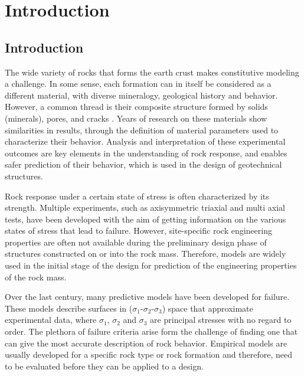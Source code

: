 \chapter{Introduction}
\section{Introduction}

The wide variety of rocks that forms the earth crust makes constitutive modeling a challenge. In some sense, each formation can in itself be considered as a different material, with diverse mineralogy, geological history and behavior. However, a common thread is their composite structure formed by solids (minerals), pores, and cracks \cite{Labuz2018}. Years of research on these materials show similarities in results, through the definition of material parameters used to characterize their behavior. Analysis and interpretation of these experimental outcomes are key elements in the understanding of rock response, and enables safer prediction of their behavior, which is used in the design of geotechnical structures. 

Rock response under a certain state of stress is often characterized by its strength. Multiple experiments, such as axisymmetric triaxial and multi axial tests, have been developed with the aim of getting information on the various states of stress that lead to failure. However, site-specific rock engineering properties are often not available during the preliminary design phase of structures constructed on or into the rock mass. Therefore, models are widely used in the initial stage of the design for prediction of the engineering properties of the rock mass. 

Over the last century, many predictive models have been developed for failure. These models describe surfaces in ($\sigma_1$-$\sigma_2$-$\sigma_3$) space that approximate experimental data, where $\sigma_1$, $\sigma_2$ and $\sigma_3$ are principal stresses with no regard to order. The plethora of failure criteria arise form the challenge of finding one that can give the most accurate description of rock behavior. Empirical models are usually developed for a specific rock type or rock formation and therefore, need to be evaluated before they can be applied to a design.


